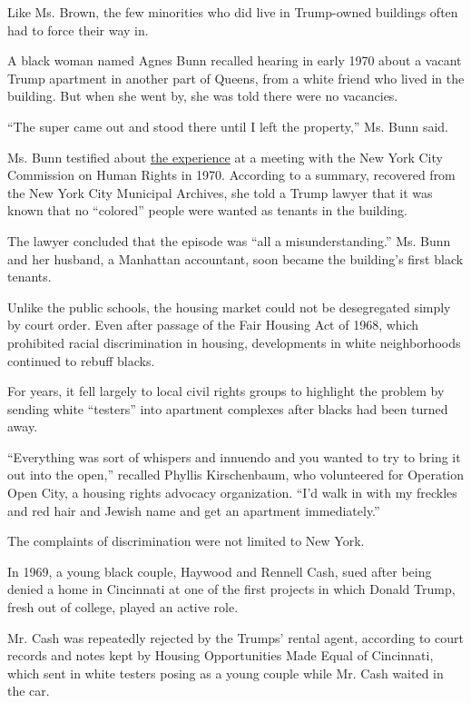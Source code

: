 Like Ms. Brown, the few minorities who did live in Trump-owned buildings
often had to force their way in.

A black woman named Agnes Bunn recalled hearing in early 1970 about a
vacant Trump apartment in another part of Queens, from a white friend
who lived in the building. But when she went by, she was told there were
no vacancies.

``The super came out and stood there until I left the property,'' Ms.
Bunn said.

Ms. Bunn testified about
\href{http://www.nytimes.com/interactive/2016/08/27/us/politics/agnes-bunn-file.html}{the
experience} at a meeting with the New York City Commission on Human
Rights in 1970. According to a summary, recovered from the New York City
Municipal Archives, she told a Trump lawyer that it was known that no
``colored'' people were wanted as tenants in the building.

The lawyer concluded that the episode was ``all a misunderstanding.''
Ms. Bunn and her husband, a Manhattan accountant, soon became the
building's first black tenants.

Unlike the public schools, the housing market could not be desegregated
simply by court order. Even after passage of the Fair Housing Act of
1968, which prohibited racial discrimination in housing, developments in
white neighborhoods continued to rebuff blacks.

For years, it fell largely to local civil rights groups to highlight the
problem by sending white ``testers'' into apartment complexes after
blacks had been turned away.

``Everything was sort of whispers and innuendo and you wanted to try to
bring it out into the open,'' recalled Phyllis Kirschenbaum, who
volunteered for Operation Open City, a housing rights advocacy
organization. ``I'd walk in with my freckles and red hair and Jewish
name and get an apartment immediately.''

The complaints of discrimination were not limited to New York.

In 1969, a young black couple, Haywood and Rennell Cash, sued after
being denied a home in Cincinnati at one of the first projects in which
Donald Trump, fresh out of college, played an active role.

Mr. Cash was repeatedly rejected by the Trumps' rental agent, according
to court records and notes kept by Housing Opportunities Made Equal of
Cincinnati, which sent in white testers posing as a young couple while
Mr. Cash waited in the car.

